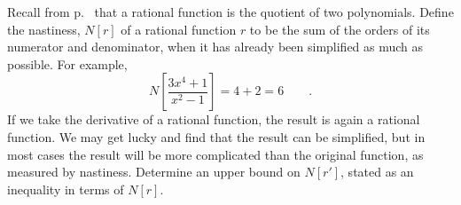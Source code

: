 Recall from p.~\pageref{rational-function-defined} that a rational function is
the quotient of two polynomials. Define the nastiness, $N[r]$ of a rational
function $r$ to be the sum of the orders of its numerator and denominator,
when it has already been simplified as much as possible. For example,
\begin{equation*}
  N\left[\frac{3x^4+1}{x^2-1}\right] = 4+2=6 \qquad .
\end{equation*}
If we take the derivative of a rational function, the result is again
a rational function. We may get lucky and
find that the result can be simplified, but in most cases the result will
be more complicated than the original function, as measured by nastiness.
Determine an upper bound on $N[r']$, stated as an inequality in terms of
$N[r]$.

